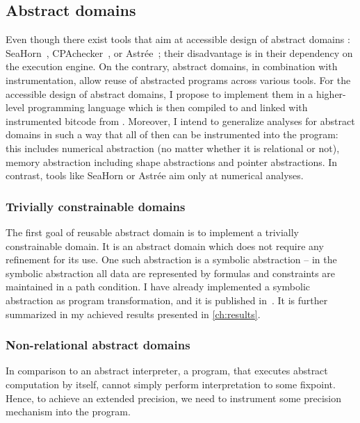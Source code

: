 \subsection{Abstract domains}

Even though there exist tools that aim at accessible design of abstract domains
: SeaHorn~\cite{Gurfinkel2015}, CPAchecker~\cite{Beyer2013}, or
Astrée~\cite{Astree}; their disadvantage is in their dependency on the
execution engine.  On the contrary, abstract domains, in combination with \lart
instrumentation, allow reuse of abstracted programs across various tools. For
the accessible design of abstract domains, I propose to implement them in a
higher-level programming language which is then compiled to
\llvm and linked with instrumented bitcode from \lart.  Moreover, I intend to
generalize analyses for abstract domains in such a way that all of then can be
instrumented into the program: this includes numerical abstraction (no matter
whether it is relational or not), memory abstraction including shape
abstractions and pointer abstractions. In contrast, tools like SeaHorn or
Astrée aim only at numerical analyses.

\subsubsection{Trivially constrainable domains}

The first goal of reusable abstract domain is to implement a trivially constrainable
domain. It is an abstract domain which does not require any refinement for its
use. One such abstraction is a symbolic abstraction -- in the symbolic
abstraction all data are represented by formulas and constraints are maintained
in a path condition. I have already implemented a symbolic abstraction as
program transformation, and it is published in~\cite{Lauko2018SymComp}.
It is further summarized in my achieved results presented in \autoref{ch:results}.

\subsubsection{Non-relational abstract domains}

In comparison to an abstract interpreter, a program, that executes abstract
computation by itself, cannot simply perform interpretation to some fixpoint. Hence,
to achieve an extended precision, we need to instrument some precision
mechanism into the program.

